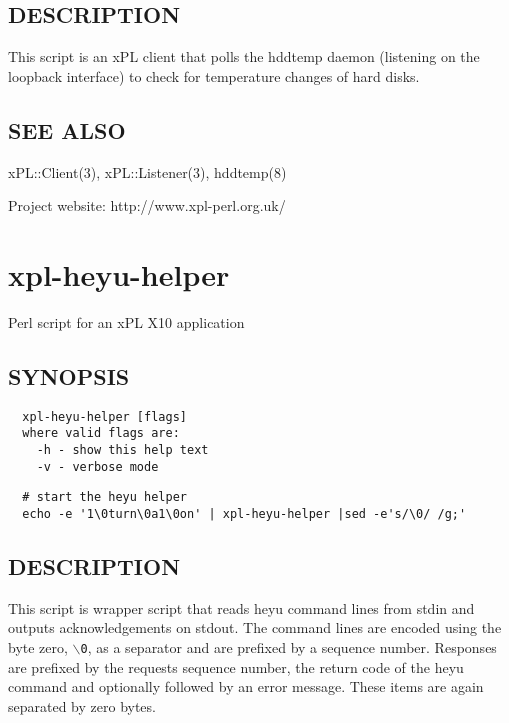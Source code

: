 \subsection*{DESCRIPTION\label{xpl-hddtemp_DESCRIPTION}}


This script is an xPL client that polls the hddtemp daemon (listening
on the loopback interface) to check for temperature changes of hard
disks.

\subsection*{SEE ALSO\label{xpl-hddtemp_SEE_ALSO}}


xPL::Client(3), xPL::Listener(3), hddtemp(8)



Project website: http://www.xpl-perl.org.uk/

\section{xpl-heyu-helper\label{xpl-heyu-helper}}


Perl script for an xPL X10 application

\subsection*{SYNOPSIS\label{xpl-heyu-helper_SYNOPSIS}}
\begin{verbatim}
  xpl-heyu-helper [flags]
  where valid flags are:
    -h - show this help text
    -v - verbose mode
\end{verbatim}
\begin{verbatim}
  # start the heyu helper
  echo -e '1\0turn\0a1\0on' | xpl-heyu-helper |sed -e's/\0/ /g;'
\end{verbatim}
\subsection*{DESCRIPTION\label{xpl-heyu-helper_DESCRIPTION}}


This script is wrapper script that reads heyu command lines from stdin
and outputs acknowledgements on stdout.  The command lines are encoded
using the byte zero, \texttt{$\backslash$0}, as a separator and are prefixed by a
sequence number.  Responses are prefixed by the requests sequence
number, the return code of the heyu command and optionally followed by
an error message.  These items are again separated by zero bytes.



